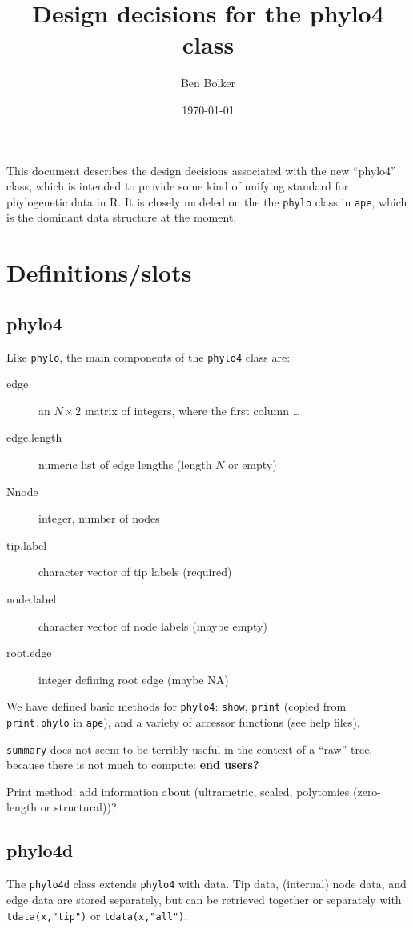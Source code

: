 \documentclass{article}
\title{Design decisions for the phylo4 class}
\author{Ben Bolker}
\date{\today}
\newcommand{\code}[1]{{{\tt #1}}}
\begin{document}
\maketitle

This document describes the design decisions associated
with the new ``phylo4'' class, which is intended to
provide some kind of unifying standard for phylogenetic
data in R.  It is closely modeled on the the \code{phylo}
class in \code{ape}, which is the dominant data structure
at the moment.

\section{Definitions/slots}

\subsection{phylo4}
Like \code{phylo}, the main components of
the \code{phylo4} class are:
\begin{description}
\item[edge]{an $N \times 2$ matrix of integers,
  where the first column \ldots}
\item[edge.length]{numeric list of edge lengths
(length $N$ or empty)}
\item[Nnode]{integer, number of nodes}
\item[tip.label]{character vector of tip labels (required)}
\item[node.label]{character vector of node labels (maybe empty)}
\item[root.edge]{integer defining root edge (maybe NA)}
\end{description}

We have defined basic methods for \code{phylo4}:
\code{show}, \code{print} (copied from \code{print.phylo} in
\code{ape}), and a variety of accessor functions (see help files).

\code{summary} does not seem to be terribly useful in the
context of a ``raw'' tree, because there is not much to
compute: \textbf{end users?}

Print method: add information about
(ultrametric, scaled, polytomies (zero-length or structural))?

\subsection{phylo4d}

The \code{phylo4d} class extends \code{phylo4}
with data.  Tip data, (internal) node data, and edge
data are stored separately, but can be retrieved
together or separately with \code{tdata(x,"tip")}
or \code{tdata(x,"all")}.
\end{document}
